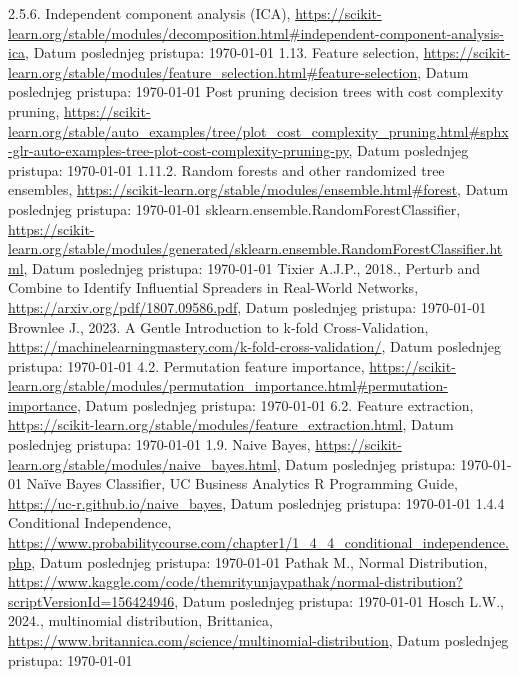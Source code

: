 \documentclass[fontsize=12bp, paper=a4]{scrarticle}
\begin{document}
\begin{thebibliography}{1}
     2.5.6. Independent component analysis (ICA), \url{https://scikit-learn.org/stable/modules/decomposition.html#independent-component-analysis-ica}, Datum poslednjeg pristupa: \today
     1.13. Feature selection, \url{https://scikit-learn.org/stable/modules/feature_selection.html#feature-selection}, Datum poslednjeg pristupa: \today
     Post pruning decision trees with cost complexity pruning, \url{https://scikit-learn.org/stable/auto_examples/tree/plot_cost_complexity_pruning.html#sphx-glr-auto-examples-tree-plot-cost-complexity-pruning-py}, Datum poslednjeg pristupa: \today
     1.11.2. Random forests and other randomized tree ensembles, \url{https://scikit-learn.org/stable/modules/ensemble.html#forest}, Datum poslednjeg pristupa: \today
     sklearn.ensemble.RandomForestClassifier, \url{https://scikit-learn.org/stable/modules/generated/sklearn.ensemble.RandomForestClassifier.html}, Datum poslednjeg pristupa: \today
     Tixier A.J.P., 2018., Perturb and Combine to Identify Influential
Spreaders in Real-World Networks, \url{https://arxiv.org/pdf/1807.09586.pdf}, Datum poslednjeg pristupa: \today
    Brownlee J., 2023. A Gentle Introduction to k-fold Cross-Validation, \url{https://machinelearningmastery.com/k-fold-cross-validation/}, Datum poslednjeg pristupa: \today
    4.2. Permutation feature importance, \url{https://scikit-learn.org/stable/modules/permutation_importance.html#permutation-importance}, Datum poslednjeg pristupa: \today
    6.2. Feature extraction, \url{https://scikit-learn.org/stable/modules/feature_extraction.html}, Datum poslednjeg pristupa: \today
    1.9. Naive Bayes, \url{https://scikit-learn.org/stable/modules/naive_bayes.html}, Datum poslednjeg pristupa: \today
    Naïve Bayes Classifier, UC Business Analytics R Programming Guide, \url{https://uc-r.github.io/naive_bayes}, Datum poslednjeg pristupa: \today
    1.4.4 Conditional Independence, \url{https://www.probabilitycourse.com/chapter1/1_4_4_conditional_independence.php}, Datum poslednjeg pristupa: \today
    Pathak M., Normal Distribution, \url{https://www.kaggle.com/code/themrityunjaypathak/normal-distribution?scriptVersionId=156424946}, Datum poslednjeg pristupa: \today
    Hosch L.W., 2024., multinomial distribution, Brittanica, \url{https://www.britannica.com/science/multinomial-distribution}, Datum poslednjeg pristupa: \today

\end{thebibliography}
\end{document}
